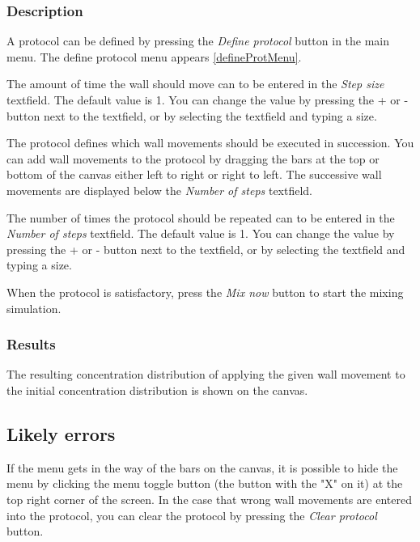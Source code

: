 \subsubsection{Description}
A protocol can be defined by pressing the \emph{Define protocol} button in the main menu. The define protocol menu appears \ref{defineProtMenu}.


The amount of time the wall should move can to be entered in the \emph{Step size} textfield. The default value is 1. You can change the value by pressing the + or - button next to the textfield, or by selecting the textfield and typing a size.

The protocol defines which wall movements should be executed in succession. You can add wall movements to the protocol by dragging the bars at the top or bottom of the canvas either left to right or right to left. The successive wall movements are displayed below the \emph{Number of steps} textfield.

The number of times the protocol should be repeated can to be entered in the \emph{Number of steps} textfield. The default value is 1. You can change the value by pressing the + or - button next to the textfield, or by selecting the textfield and typing a size.

When the protocol is satisfactory, press the \emph{Mix now} button to start the mixing simulation.

\subsubsection{Results}
The resulting concentration distribution of applying the given wall movement to the initial concentration distribution is shown on the canvas.

\subsection{Likely errors}
If the menu gets in the way of the bars on the canvas, it is possible to hide the menu by clicking the menu toggle button (the button with the "X" on it) at the top right corner of the screen. In the case that wrong wall movements are entered into the protocol, you can clear the protocol by pressing the \emph{Clear protocol} button.


